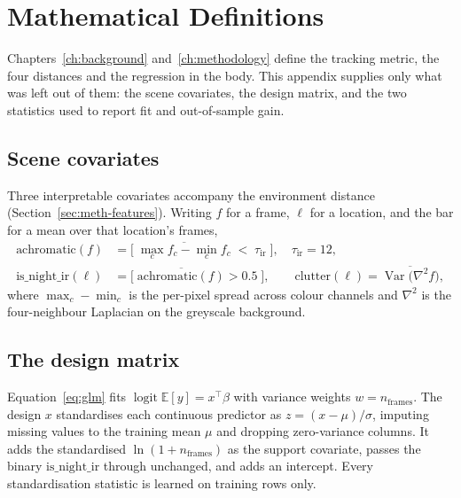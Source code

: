 
\chapter{Mathematical Definitions}
\label{app:formulas}
Chapters~\ref{ch:background} and~\ref{ch:methodology} define the tracking metric, the four distances and
the regression in the body. This appendix supplies only what was left out of them: the scene covariates, the design matrix, and the two
statistics used to report fit and out-of-sample gain.

\section{Scene covariates}
\label{app:covariates}
Three interpretable covariates accompany the environment distance (Section~\ref{sec:meth-features}). Writing
$f$ for a frame, $\ell$ for a location, and the bar for a mean over that location's frames,
\begin{align}
  \text{achromatic}(f) &= \Big[\; \overline{\max_c f_c - \min_c f_c} \;<\; \tau_{\mathrm{ir}}\;\Big],\quad \tau_{\mathrm{ir}}=12,\\
  \mathrm{is\_night\_ir}(\ell) &= \big[\; \overline{\text{achromatic}(f)} > 0.5 \;\big],\qquad
  \mathrm{clutter}(\ell) = \overline{\operatorname{Var}\!\big(\nabla^2 f\big)},
\end{align}
where $\max_c-\min_c$ is the per-pixel spread across colour channels and $\nabla^2$ is the four-neighbour
Laplacian on the greyscale background.

\section{The design matrix}
\label{app:design}
Equation~\ref{eq:glm} fits $\operatorname{logit}\mathbb{E}[y]=x^{\!\top}\beta$ with variance weights
$w=n_{\mathrm{frames}}$. The design $x$ standardises each continuous predictor as $z=(x-\mu)/\sigma$, imputing
missing values to the training mean $\mu$ and dropping zero-variance columns. It adds the standardised
$\ln(1+n_{\mathrm{frames}})$ as the support covariate, passes the binary $\mathrm{is\_night\_ir}$ through
unchanged, and adds an intercept. Every standardisation statistic is learned on training rows only.

